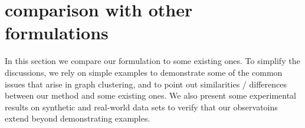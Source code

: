 \section{comparison with other formulations}
\label{sec:comparison-other}

In this section we compare our formulation to some existing ones. To simplify the discussions, we
rely on simple examples to demonstrate some of the common issues that arise in graph clustering, and
to point out similarities / differences between our method and some existing ones. We also present
some experimental results on synthetic and real-world data sets to verify that our observatoins
extend beyond demonstrating examples.



